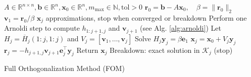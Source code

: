 \begin{algorithm}[H]
    \begin{algorithmic}[0]
        \Require
        \State $A \in \mathbb{R}^{n \times n}, \mathbf{b} \in \mathbb{R}^n, \mathbf{x}_0 \in \mathbb{R}^n, m_{\max} \in \mathbb{N}, \text{tol} > 0$
        \State $\mathbf{r}_0 = \mathbf{b} - A\mathbf{x}_0, \quad \beta = \|\mathbf{r}_0\|_2$
        \State $\mathbf{v}_1 = \mathbf{r}_0 / \beta$
        \Ensure
        \State $\mathbf{x}_j$ approximations, stop when converged or breakdown
        \State Perform one Arnoldi step to compute $h_{1:j+1,j}$ and $\mathbf{v}_{j+1}$ (see Alg. \ref{alg:arnoldi})
        \State Let $H_j = \overline{H}_j(1:j,1:j)$ and $V_j = [\mathbf{v}_1,\ldots,\mathbf{v}_j]$
        \State Solve $H_j \mathbf{y}_j = \beta \mathbf{e}_1$
        \State $\mathbf{x}_j = \mathbf{x}_0 + V_j \mathbf{y}_j$
        \State $\mathbf{r}_j = -h_{j+1,j} \mathbf{v}_{j+1} \mathbf{e}_j^\top \mathbf{y}_j$
        \State Return $\mathbf{x}_j$
        \EndIf
        \State Breakdown: exact solution in $\mathcal{K}_j$ (stop)
        \EndIf
        \EndFor
    \end{algorithmic}
    \caption{Full Orthogonalization Method (FOM)}
    \label{alg:fom}
\end{algorithm}